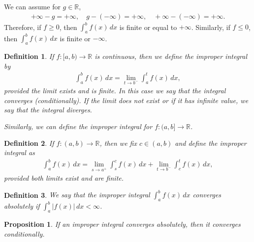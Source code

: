 \documentclass[10pt]{book}
\newtheorem{definition}{Definition}[chapter]
\newtheorem{proposition}{Proposition}[chapter]
\theoremstyle{definition}
\numberwithin{equation}{chapter}
\begin{document}
\medskip

We can assume for $g \in \mathbb{R}$,
\begin{align*}
    + \infty - g = + \infty, \quad g - (-\infty) = + \infty, \quad + \infty - (- \infty) = + \infty.
\end{align*}
Therefore, if $f \geq 0$, then $\int^b_a f(x) \,dx$ is finite or equal to $+ \infty$. Similarly, if $f \leq 0$, then $\int^b_a f(x) \,dx$ is finite or $- \infty$.

\medskip

\begin{definition}
If $f: [a,b) \to \mathbb{R}$ is continuous, then we define the improper integral by
\begin{align*}
    \int^b_a f(x) \,dx = \lim_{t \to b^-} \int^t_a f(x) \,dx,
\end{align*}
provided the limit exists and is finite. In this case we say that the integral converges (conditionally). If the limit does not exist or if it has infinite value, we say that the integral diverges.

Similarly, we can define the improper integral for $f:(a,b] \to \mathbb{R}$. 
\end{definition}

\medskip

\begin{definition}
If $f:(a,b) \to \mathbb{R}$, then we fix $c \in (a,b)$ and define the improper integral as
\begin{align*}
    \int^b_a f(x) \,dx = \lim_{s \to a^+} \int^c_s f(x) \,dx + \lim_{t \to b^-} \int^t_c f(x) \,dx,
\end{align*}
provided both limits exist and are finite.
\end{definition}

\medskip

\begin{definition}
We say that the improper integral $\int^b_a f(x) \,dx$ converges absolutely if $\int^b_a \left|f(x)\right| \,dx < \infty$.
\end{definition}

\begin{proposition}
If an improper integral converges absolutely, then it converges conditionally.
\end{proposition}

\medskip
\end{document}
